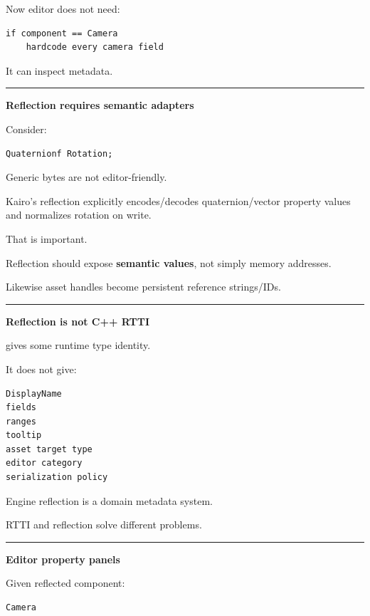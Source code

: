 Now editor does not need:

\begin{verbatim}
if component == Camera
    hardcode every camera field
\end{verbatim}

It can inspect metadata.

\begin{center}\rule{0.5\linewidth}{0.5pt}\end{center}

\textbf{Reflection requires semantic adapters}

Consider:

\begin{verbatim}
Quaternionf Rotation;
\end{verbatim}

Generic bytes are not editor-friendly.

Kairo's reflection explicitly encodes/decodes quaternion/vector property values and normalizes rotation on write.

That is important.

Reflection should expose \textbf{semantic values}, not simply memory addresses.

Likewise asset handles become persistent reference strings/IDs.

\begin{center}\rule{0.5\linewidth}{0.5pt}\end{center}

\textbf{Reflection is not C++ RTTI}

 gives some runtime type identity.

It does not give:

\begin{verbatim}
DisplayName
fields
ranges
tooltip
asset target type
editor category
serialization policy
\end{verbatim}

Engine reflection is a domain metadata system.

RTTI and reflection solve different problems.

\begin{center}\rule{0.5\linewidth}{0.5pt}\end{center}

\textbf{Editor property panels}

Given reflected component:

\begin{verbatim}
Camera
\end{verbatim}

